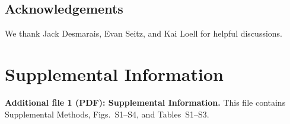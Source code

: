 \documentclass[pdflatex,sn-vancouver-num,referee,oneside]{sn-jnl}
\begin{document}
\subsection*{Acknowledgements}
We thank Jack Desmarais, Evan Seitz, and Kai Loell for helpful discussions.

\section*{Supplemental Information}

\textbf{Additional file 1 (PDF): Supplemental Information.}
This file contains Supplemental Methods, Figs.~S1--S4, and Tables~S1--S3.


\end{document}
